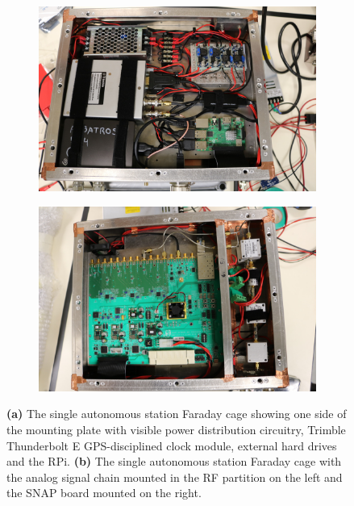 \begin{figure}
	\centering
	\begin{subfigure}[t]{0.52\textwidth}
		\centering
		\includegraphics[width=\linewidth]{Figures/46966493985_44aa8ac326_o} 
		\caption{} \label{Fig:46966493985_44aa8ac326_o}
	\end{subfigure}
	\hfill
	\begin{subfigure}[t]{0.47\textwidth}
		\centering
		\includegraphics[width=\linewidth]{Figures/47882594521_3895effd86_o}
		\caption{} \label{Fig:47882594521_3895effd86_o}
	\end{subfigure}
	\caption{{\bf (a)} The single autonomous station Faraday cage showing one side of the mounting plate with visible power distribution circuitry, Trimble Thunderbolt E GPS-disciplined clock module, external hard drives and the RPi. {\bf (b)} The single autonomous station Faraday cage with the analog signal chain mounted in the RF partition on the left and the SNAP board mounted on the right.} \label{Fig:faraday}
\end{figure}

